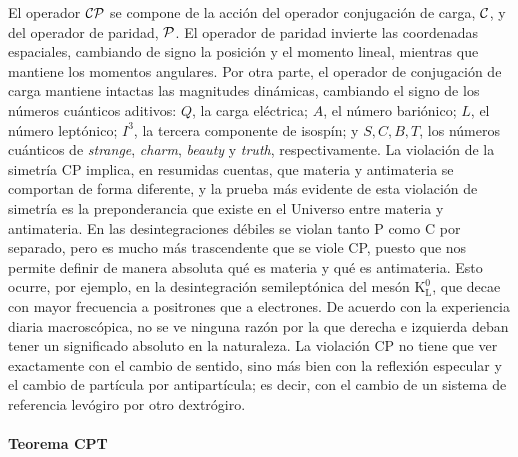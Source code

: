 El operador $\mathcal{CP}$ se compone de la acción del operador conjugación de carga, $\mathcal{C}$, y del operador de paridad, $\mathcal{P}$.
El operador de paridad invierte las coordenadas espaciales, cambiando de signo la posición y el momento lineal, mientras que mantiene los momentos angulares. Por otra parte, el operador de conjugación de carga mantiene intactas las magnitudes dinámicas, cambiando el signo de los números  cuánticos aditivos: $ Q$, la carga eléctrica; $A$, el número  bariónico; $ L$, el número  leptónico; $I^3$, la tercera componente de  isospín; y $ S, C, B, T$, los números cuánticos de \textit{strange}, \textit{charm}, \textit{beauty} y \textit{truth}, respectivamente.
%
La violación de la  simetría CP implica, en resumidas cuentas, que materia y  antimateria se comportan de forma diferente, y la prueba más evidente de esta violación de  simetría es la preponderancia que existe en el Universo entre materia y  antimateria. En las desintegraciones débiles se violan tanto P como C por separado, pero es mucho más trascendente que  se viole CP, puesto que nos permite definir de manera absoluta qué es materia y qué es  antimateria. Esto ocurre, por ejemplo, en la desintegración  semileptónica del mesón $\mathrm{K_L^0}$, que decae con mayor frecuencia a  positrones que a electrones. 
%
De acuerdo con la experiencia diaria  macroscópica, no se ve ninguna razón por la que derecha e izquierda deban tener un significado absoluto en la naturaleza. La violación CP no tiene que ver exactamente con el cambio de sentido, sino más bien con la reflexión especular y el cambio de partícula por  antipartícula; es decir, con el cambio de un sistema de referencia  levógiro por otro  dextrógiro.%



\paragraph{Teorema CPT}

